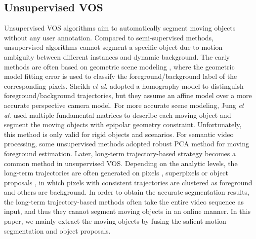 \documentclass[journal]{IEEEtran}
\newcommand{\etal}{\textit{et al}. }
\begin{document}
\subsection{Unsupervised VOS}
Unsupervised VOS algorithms aim to automatically segment moving objects without any user annotation. Compared to semi-supervised methods, unsupervised algorithms cannot segment a specific object due to motion ambiguity between different instances and dynamic background.
The early methods \cite{ICCV2009_Sheikh,CVPR2014_Jung} are often based on geometric scene modeling \cite{Book2003_Hartley}, where the geometric model fitting error is used to classify the foreground/background label of the corresponding pixels.
Sheikh \etal \cite{ICCV2009_Sheikh} adopted a homography model to distinguish foreground/background trajectories, 
but they assume an affine model over a more accurate perspective camera model. 
For more accurate scene modeling, Jung \etal \cite{CVPR2014_Jung} used multiple fundamental matrices to describe each moving object and segment the moving objects with epipolar geometry constraint. Unfortunately, this method is only valid for rigid objects and scenarios. For semantic video processing, some unsupervised methods adopted robust PCA method \cite{TPAMI2013_zhou,TPAMI2014_Gao,TIP2016_Li,AVSS2015_Sobral} for moving foreground estimation.
Later, long-term trajectory-based strategy \cite{ICCV2013_Papazoglou,CVPR2012_Ochs,CVPR2016_Xiao,BMVC2014_Faktor} becomes a common method in unsupervised VOS.
Depending on the analytic levels, the long-term trajectories are often generated on pixels \cite{CVPR2012_Ochs}, superpixels \cite{ICCV2013_Papazoglou,BMVC2014_Faktor,ECCV2014_Jain} or object proposals \cite{CVPR2016_Xiao,CVPR2015_Fragkiadaki,CVPR2017_Koh}, in which pixels with consistent trajectories are clustered as foreground and others are background. In order to obtain the accurate segmentation results, the long-term trajectory-based methods often take the entire video sequence as input, and thus they cannot segment moving objects in an online manner. In this paper, we mainly extract the moving objects by fusing the salient motion segmentation and object proposals.
\end{document}
